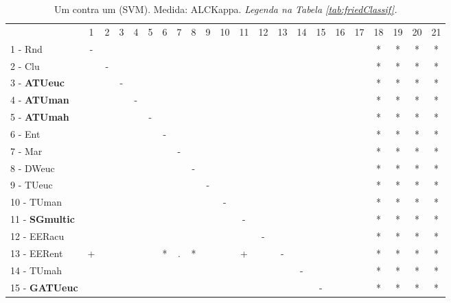 \begin{table}[h]
\caption{Um contra um (SVM). Medida: ALCKappa. \textit{Legenda na Tabela \ref{tab:friedClassif}.}}
\begin{center}\begin{tabular}{lcc|cc|cc|cc|cc|cc|cc|cc|cc|cc|c}
 			& 1 & 2 & 3 & 4 & 5 & 6 & 7 & 8 & 9 & 10 & 11 & 12 & 13 & 14 & 15 & 16 & 17 & 18 & 19 & 20 & 21\\
1 - Rnd  	& - &   &   &   &   &   &   &   &   &   &   &   &   &   &   &   &   & * & * & * & * \\
2 - Clu  	&   & - &   &   &   &   &   &   &   &   &   &   &   &   &   &   &   & * & * & * & * \\ \hline
3 - \textbf{ATUeuc}	&   &   & - &   &   &   &   &   &   &   &   &   &   &   &   &   &   & * & * & * & * \\
4 - \textbf{ATUman}	&   &   &   & - &   &   &   &   &   &   &   &   &   &   &   &   &   & * & * & * & * \\ \hline
5 - \textbf{ATUmah}	&   &   &   &   & - &   &   &   &   &   &   &   &   &   &   &   &   & * & * & * & * \\
6 - Ent  	&   &   &   &   &   & - &   &   &   &   &   &   &   &   &   &   &   & * & * & * & * \\ \hline
7 - Mar  	&   &   &   &   &   &   & - &   &   &   &   &   &   &   &   &   &   & * & * & * & * \\
8 - DWeuc	&   &   &   &   &   &   &   & - &   &   &   &   &   &   &   &   &   & * & * & * & * \\ \hline
9 - TUeuc	&   &   &   &   &   &   &   &   & - &   &   &   &   &   &   &   &   & * & * & * & * \\
10 - TUman	&   &   &   &   &   &   &   &   &   & - &   &   &   &   &   &   &   & * & * & * & * \\ \hline
11 - \textbf{SGmultic}	&   &   &   &   &   &   &   &   &   &   & - &   &   &   &   &   &   & * & * & * & * \\
12 - EERacu	&   &   &   &   &   &   &   &   &   &   &   & - &   &   &   &   &   & * & * & * & * \\ \hline
13 - EERent	& + &   &   &   &   & * & . & * &   &   & + &   & - &   &   &   &   & * & * & * & * \\
14 - TUmah	&   &   &   &   &   &   &   &   &   &   &   &   &   & - &   &   &   & * & * & * & * \\ \hline
15 - \textbf{GATUeuc}	&   &   &   &   &   &   &   &   &   &   &   &   &   &   & - &   &   & * & * & * & * \\

\end{tabular}
\end{center}
\end{table}
